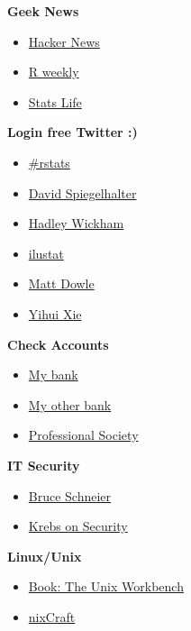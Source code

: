 \documentclass[]{book}
\providecommand{\tightlist}{%
  \setlength{\itemsep}{0pt}\setlength{\parskip}{0pt}}
\theoremstyle{definition}
\theoremstyle{definition}
\theoremstyle{definition}
\theoremstyle{remark}
\begin{document}
\textbf{Geek News}

\begin{itemize}
\tightlist
\item
  \href{https://news.ycombinator.com/}{Hacker News}
\item
  \href{https://rweekly.org}{R weekly}
\item
  \href{https://www.statslife.org.uk/}{Stats Life}
\end{itemize}

\textbf{Login free Twitter :)}

\begin{itemize}
\tightlist
\item
  \href{https://twitter.com/hashtag/rstats?src=hash}{\#rstats}
\item
  \href{https://twitter.com/d_spiegel}{David Spiegelhalter}
\item
  \href{https://twitter.com/hadleywickham}{Hadley Wickham}
\item
  \href{https://twitter.com/ilustat}{ilustat}
\item
  \href{https://twitter.com/MattDowle}{Matt Dowle}
\item
  \href{https://twitter.com/xieyihui}{Yihui Xie}
\end{itemize}

\textbf{Check Accounts}

\begin{itemize}
\tightlist
\item
  \href{https://www.example.com/}{My bank}
\item
  \href{https://www.example.com/}{My other bank}
\item
  \href{https://www.example.com/}{Professional Society}
\end{itemize}

\textbf{IT Security}

\begin{itemize}
\tightlist
\item
  \href{https://www.schneier.com/}{Bruce Schneier}
\item
  \href{https://krebsonsecurity.com/}{Krebs on Security}
\end{itemize}

\textbf{Linux/Unix}

\begin{itemize}
\tightlist
\item
  \href{http://seankross.com/the-unix-workbench/}{Book: The Unix
  Workbench}
\item
  \href{https://www.cyberciti.biz/}{nixCraft}
\end{itemize}
\end{document}
